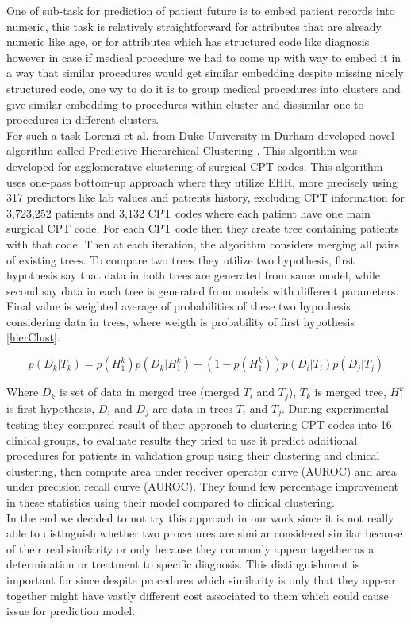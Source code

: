 
One of sub-task for prediction of patient future is to embed patient records into numeric, this task is relatively straightforward for attributes that are already numeric like age, or for attributes which has structured code like diagnosis however in case if medical procedure we had to come up with way to embed it in a way that similar procedures would get similar embedding despite missing nicely structured code, one wy to do it is to group medical procedures into clusters and give similar embedding to procedures within cluster and dissimilar one to procedures in different clusters.
\\

For such a task Lorenzi et al. from Duke University in Durham developed novel algorithm called Predictive Hierarchical Clustering \cite{lorenzi2017predictive}. This algorithm was developed for agglomerative clustering of surgical CPT codes. This algorithm uses one-pass bottom-up approach where they utilize EHR, more precisely using 317 predictors like lab values and patients history, excluding CPT information for 3,723,252 patients and 3,132 CPT codes where each patient have one main surgical CPT code. For each CPT code then they create tree containing patients with that code. Then at each iteration, the algorithm considers merging all pairs of existing trees. To compare two trees they utilize two hypothesis, first hypothesis say that data in both trees are generated from same model, while second say data in each tree is generated from models with different parameters. Final value is weighted average of probabilities of these two hypothesis considering data in trees, where weigth is probability of first hypothesis \ref{hierClust}.

\begin{equation}
	\label{hierClust}
	p(D_k \vert T_k) = p(H_1^k)p(D_k \vert H_1^k) + (1 - p(H_1^k))p(D_i \vert T_i)p(D_j \vert T_j)
\end{equation} 

Where $D_k$ is set of data in merged tree (merged $T_i$ and $T_j$), $T_k$ is merged tree, $H_1^k$ is first hypothesis, $D_i$ and $D_j$ are data in trees $T_i$ and $T_j$. During experimental testing they compared result of their approach to clustering CPT codes into 16 clinical groups, to evaluate results they tried to use it predict additional procedures for patients in validation group using their clustering and clinical clustering, then compute area under  receiver operator curve (AUROC) and area under precision recall curve (AUROC). They found few percentage improvement in these statistics using their model compared to clinical clustering.
\\

In the end we decided to not try this approach in our work since it is not really able to distinguish whether two procedures are similar considered similar because of their real similarity or only because they commonly appear together as a determination or treatment to specific diagnosis. This distinguishment is important for since despite procedures which similarity is only that they appear together might have vastly different cost associated to them which could cause issue for prediction model.